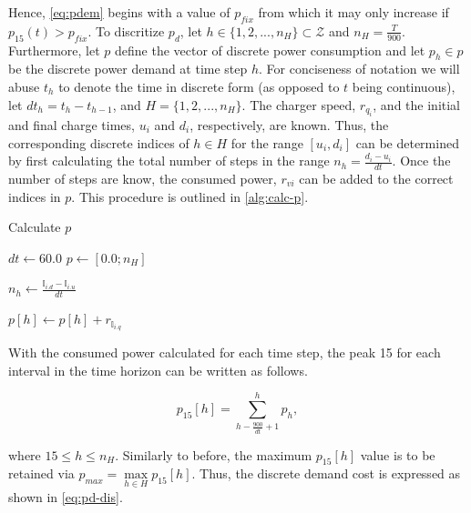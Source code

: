 \documentclass[11pt,a4paper,final]{article}
\newcommand{\I}{\mathbb{I}}                 %
\newcommand{\Hset}{H}                       %
\begin{document}
Hence, \ref{eq:pdem} begins with a value of \(p_{fix}\) from which it may only increase if \(p_{15}(t) > p_{fix}\). To discritize
\(p_d\), let \(h \in \{ 1, 2, ..., n_H \} \subset \mathcal{Z}\) and \(n_H = \frac{T}{900}\). Furthermore, let \(p\) define the vector of discrete
power consumption and let \(p_h \in p\) be the discrete power demand at time step \(h\). For conciseness of notation we will
abuse \(t_h\) to denote the time in discrete form (as opposed to \(t\) being continuous), let \(dt_h = t_h - t_{h-1}\), and
\(\Hset = \{ 1, 2, ..., n_H \}\). The charger speed, \(r_{q_i}\), and the initial and final charge times, \(u_i\) and \(d_i\),
respectively, are known. Thus, the corresponding discrete indices of \(h \in \Hset\) for the range \([u_i, d_i]\) can be
determined by first calculating the total number of steps in the range \(n_h = \frac{d_i - u_i}{dt}\). Once the number of
steps are know, the consumed power, \(r_{vi}\) can be added to the correct indices in \(p\). This procedure is outlined in
\ref{alg:calc-p}.

\begin{algorithm}[H]
\caption{Calculate $p$} \label{alg:calc-p}
\LinesNumbered
{}
\KwIn{$(\I, r)$}

\Begin
{
  $dt \leftarrow 60.0 $
  $p \leftarrow [0.0; n_H]$

  \ForEach {$\I_i \in \I$}
  {
    $n_h \leftarrow \frac{\I_{i.d} - \I_{i.u}}{dt}$

    {
      $p[h] \leftarrow p[h] + r_{\I_{i.q}}$
    }
  }
}
\end{algorithm}

With the consumed power calculated for each time step, the peak 15 for each interval in the time horizon can be written
as follows.

\begin{equation}
p_{15}[h] = \sum_{h-\frac{900}{dt}+1}^h p_h,
\end{equation}

where \(15 \le h \le n_H\). Similarly to before, the maximum \(p_{15}[h]\) value is to be retained via \(p_{max} = \max\limits_{h
\in H}p_{15}[h]\). Thus, the discrete demand cost is expressed as shown in \ref{eq:pd-dis}.
\end{document}

